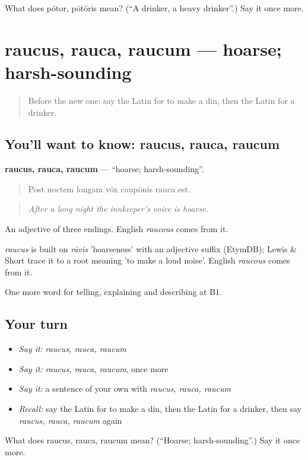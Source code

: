 \begin{tcolorbox}[breakable,colback=teal!4,colframe=teal!35!black,title={Before you move on}]
What does pōtor, pōtōris mean? (\textquotedblleft{}A drinker, a heavy drinker\textquotedblright{}.) Say it once more.
\end{tcolorbox}
\section[raucus, rauca, raucum]{raucus, rauca, raucum — hoarse; harsh-sounding}

\label{lesson:LA-C448-raucus}



\begin{quote}
Before the new one: say the Latin for to make a din, then the Latin for a drinker.
\end{quote}

\subsection*{You'll want to know: raucus, rauca, raucum}
\textbf{raucus, rauca, raucum} — \textquotedblleft{}hoarse; harsh-sounding\textquotedblright{}.

\begin{quote}
Post noctem longam vōx caupōnis rauca est.
\end{quote}

\begin{quote}
\emph{After a long night the innkeeper's voice is hoarse.}
\end{quote}

An adjective of three endings. English \emph{raucous} comes from it.

\begin{cousinweb}
\emph{raucus} is built on \emph{rāvis} 'hoarseness' with an adjective suffix (EtymDB); Lewis \& Short trace it to a root meaning 'to make a loud noise'. English \emph{raucous} comes from it.
\end{cousinweb}

\begin{grammarlens}[title={What you've built}]
One more word for telling, explaining and describing at B1.
\end{grammarlens}

\subsection*{Your turn}
\begin{itemize}
\raggedright
  \item \emph{Say it:} \emph{raucus, rauca, raucum}
  \item \emph{Say it:} \emph{raucus, rauca, raucum}, once more
  \item \emph{Say it:} a sentence of your own with \emph{raucus, rauca, raucum}
  \item \emph{Recall:} say the Latin for to make a din, then the Latin for a drinker, then say \emph{raucus, rauca, raucum} again
\end{itemize}

\begin{tcolorbox}[breakable,colback=teal!4,colframe=teal!35!black,title={Before you move on}]
What does raucus, rauca, raucum mean? (\textquotedblleft{}Hoarse; harsh-sounding\textquotedblright{}.) Say it once more.
\end{tcolorbox}
